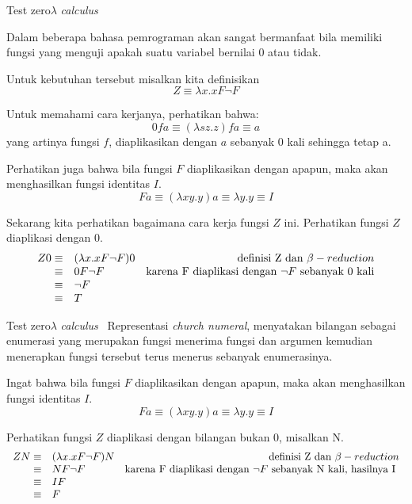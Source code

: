 \documentclass[aspectratio=1610,10pt,handout]{beamer}
\newcommand{\lc}{$\lambda$ {\it calculus}\ }
\begin{document}
\begin{frame}{Test zero}{\lc}

	Dalam beberapa bahasa pemrograman akan sangat bermanfaat bila
	memiliki fungsi yang menguji apakah suatu variabel bernilai 0 atau tidak.

	Untuk kebutuhan tersebut misalkan kita definisikan
	$$ Z \equiv  \lambda x. x F \neg F $$

	Untuk memahami cara kerjanya, perhatikan bahwa:
	$$ 0 f a \equiv (\lambda s z. z) f a \equiv a $$
	yang artinya fungsi $f$, diaplikasikan dengan  $a$ sebanyak 0 kali sehingga tetap a.

	\pause
	Perhatikan juga bahwa bila fungsi $F$ diaplikasikan dengan apapun, maka akan menghasilkan fungsi identitas $I$.
	$$Fa \equiv (\lambda x y . y ) a \equiv \lambda y.y \equiv I$$

	Sekarang kita perhatikan bagaimana cara kerja fungsi $Z$ ini. Perhatikan fungsi $Z$ diaplikasi dengan 0.
	\[
	\begin{array}{rlr}
    Z0 \equiv & (\lambda x.xF \neg F)0   & $definisi Z dan $ \beta-reduction \\
         \equiv & 0F \neg F & $karena F diaplikasi dengan $ \neg F $ sebanyak 0 kali$ \\
         \equiv &  \neg F &  \\
         \equiv & T   & \\
    \end{array}
	\]

\end{frame}

\begin{frame}{Test zero}{\lc}
	Representasi {\it church numeral}, menyatakan bilangan sebagai enumerasi yang merupakan fungsi menerima fungsi dan argumen kemudian menerapkan fungsi tersebut terus menerus sebanyak enumerasinya.

	Ingat bahwa bila fungsi $F$ diaplikasikan dengan apapun, maka akan menghasilkan fungsi identitas $I$.
	$$Fa \equiv (\lambda x y . y ) a \equiv \lambda y.y \equiv I$$

	Perhatikan fungsi $Z$ diaplikasi dengan bilangan bukan 0, misalkan N.
	\[
	\begin{array}{rlr}
	ZN \equiv & (\lambda x.xF \neg F)N & $definisi Z dan $ \beta-reduction \\
	\equiv & NF \neg F & $karena F diaplikasi dengan $ \neg F $ sebanyak N kali, hasilnya I $ \\
	\equiv &  I F &  \\
	\equiv & F  & \\
	\end{array}
	\]

\end{frame}
\end{document}
